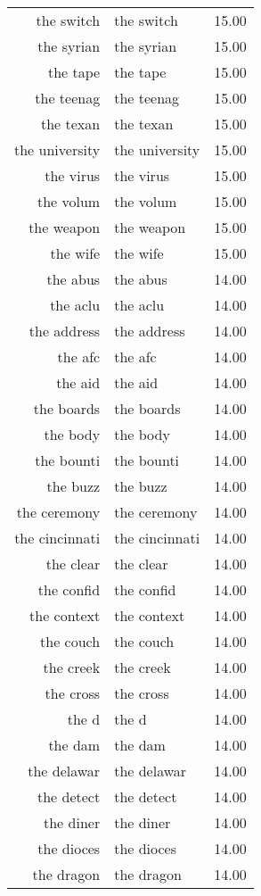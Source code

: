 \begin{table}[ht]
\begin{tabular}{rlr}
  the switch & the switch & 15.00 \\ 
  the syrian & the syrian & 15.00 \\ 
  the tape & the tape & 15.00 \\ 
  the teenag & the teenag & 15.00 \\ 
  the texan & the texan & 15.00 \\ 
  the university & the university & 15.00 \\ 
  the virus & the virus & 15.00 \\ 
  the volum & the volum & 15.00 \\ 
  the weapon & the weapon & 15.00 \\ 
  the wife & the wife & 15.00 \\ 
  the abus & the abus & 14.00 \\ 
  the aclu & the aclu & 14.00 \\ 
  the address & the address & 14.00 \\ 
  the afc & the afc & 14.00 \\ 
  the aid & the aid & 14.00 \\ 
  the boards & the boards & 14.00 \\ 
  the body & the body & 14.00 \\ 
  the bounti & the bounti & 14.00 \\ 
  the buzz & the buzz & 14.00 \\ 
  the ceremony & the ceremony & 14.00 \\ 
  the cincinnati & the cincinnati & 14.00 \\ 
  the clear & the clear & 14.00 \\ 
  the confid & the confid & 14.00 \\ 
  the context & the context & 14.00 \\ 
  the couch & the couch & 14.00 \\ 
  the creek & the creek & 14.00 \\ 
  the cross & the cross & 14.00 \\ 
  the d & the d & 14.00 \\ 
  the dam & the dam & 14.00 \\ 
  the delawar & the delawar & 14.00 \\ 
  the detect & the detect & 14.00 \\ 
  the diner & the diner & 14.00 \\ 
  the dioces & the dioces & 14.00 \\ 
  the dragon & the dragon & 14.00 \\ 

\end{tabular}
\end{table}
